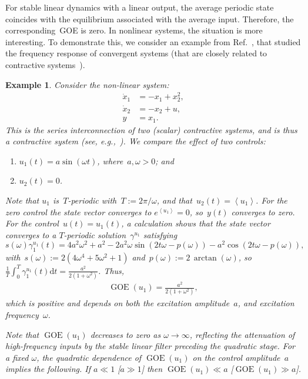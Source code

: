 \documentclass[onecolumn]{IEEEtran}
\newcommand{\GOE}{\operatorname{GOE}}
\newcommand{\avg}[1]{\left\langle #1\right\rangle}
\newtheorem{example}[theorem]{Example}
\begin{document}
For stable linear dynamics with a linear output, the average periodic state
coincides with the equilibrium associated with the average input. Therefore,
the corresponding~GOE is zero. In nonlinear systems, the situation is more interesting. 
To demonstrate this, we consider
an example from Ref.~\cite{Pavlov2007}, that  studied the frequency response of convergent systems (that are closely related to contractive systems~\cite{RUFFER2013277}).  
\begin{example}\label{exa:nonlin_with_goe}
    Consider the non-linear system:    \begin{align}\label{eq:nolonpav}
    \dot x_1&=-x_1+x_2^2,\nonumber\\
    \dot x_2&=-x_2+u,\nonumber\\
    y&=x_1.
    \end{align}
This is the series interconnection of two (scalar)  contractive  systems,  and is thus a  contractive system (see, e.g.,~\cite{ofir2021sufficient}).
We compare the effect of two controls:
\begin{enumerate}
    \item  $u_1(t)=a\sin(\omega t)$, 
where~$  a,\omega>0$; and
\item 
$u_2(t)=0$.
 \end{enumerate}
Note that $u_1$ is~$T$-periodic with~$T:=2\pi/\omega$,
and that~$u_2(t)=\avg{u_1}$.
For the zero control  the state vector converges  to $e^{\avg{u_1}}=0$, so~$y(t)$ converges to zero. 
For the control~$u(t)=u_1(t) $,   a calculation shows that the state vector 
 converges to a $T$-periodic solution~$\gamma^{u_1}$ satisfying 
\begin{equation*} 
s(\omega)
\gamma_1^{u_1}(t)= 4a^2\omega^2+a^2-2a^2\omega\sin(2t\omega-p(\omega))-a^2\cos( 2t\omega-p(\omega)),  
\end{equation*}
with~$s(\omega):=2(4\omega^4+5\omega^2+1) $ and~$p(\omega):=2\,
 \arctan (\omega)$,
so 
$\frac{1}{T}\int_0^T \gamma_1^{u_1}
(t) \mathrm{d} t 
 = \frac{a^2 }{2(1+\omega^2)} 
$. Thus, 
\begin{align}\label{eq:GOE_ISQUAD}
\GOE(u_1)=\frac{a^2 }{2(1+\omega^2)} ,
\end{align}
which is  positive and depends on both  the excitation amplitude~$a$, and excitation
frequency~$\omega$. 

Note that $\GOE(u_1)$
decreases to zero as $\omega\to\infty$, reflecting the attenuation of high-frequency inputs by the stable
linear filter preceding the quadratic stage.
For a fixed $\omega$, the quadratic dependence of $\GOE(u_1)$ on the control amplitude~$a$ implies the following. If $a\ll 1$ [$a\gg 1$] then $\GOE(u_1)\ll a$ [$\GOE(u_1)\gg a$]. 
\end{example}
\end{document}
